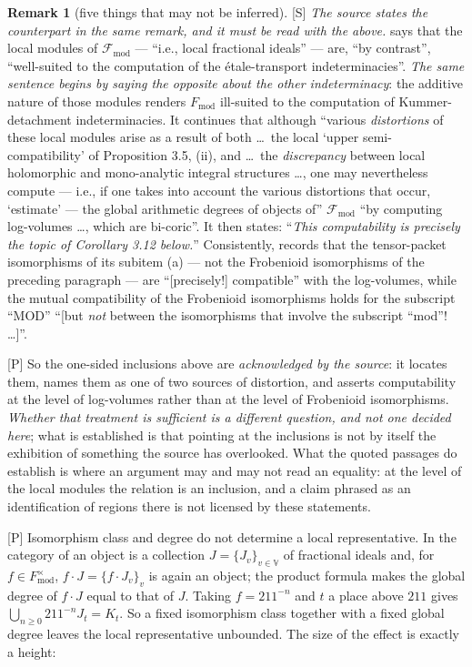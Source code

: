 \documentclass[11pt]{article}
\theoremstyle{plain}
\theoremstyle{definition}
\newtheorem{remark}{Remark}
\newcommand{\Fmod}{F_{\mathrm{mod}}}
\begin{document}
\begin{remark}[five things that may not be inferred]
\textup{[S]} \emph{The source states the counterpart in the same remark, and it must
be read with the above.}  \cite[Rem.~3.10.1(iii)]{IUT3} says that the local modules
of $\mathcal F_{\mathrm{mod}}$ --- ``i.e., local fractional ideals'' --- are, ``by
contrast'', ``well-suited to the computation of the étale-transport
indeterminacies''.  \emph{The same sentence begins by saying the opposite about the
other indeterminacy}: the additive nature of those modules renders $\Fmod$
ill-suited to the computation of Kummer-detachment indeterminacies.  It continues that
although ``various \emph{distortions} of these local
modules arise as a result of both \dots\ the local `upper semi-compatibility' of
Proposition 3.5, (ii), and \dots\ the \emph{discrepancy} between local holomorphic
and mono-analytic integral structures \dots, one may nevertheless compute --- i.e.,
if one takes into account the various distortions that occur, `estimate' --- the
global arithmetic degrees of objects of'' $\mathcal F_{\mathrm{mod}}$ ``by computing
log-volumes \dots, which are bi-coric''.  It then states: ``\emph{This computability
is precisely the topic of Corollary 3.12 below.}''  Consistently,
\cite[Thm.~3.11(ii)]{IUT3} records that the tensor-packet isomorphisms of its
subitem (a) --- not the Frobenioid isomorphisms of the preceding paragraph --- are
``[precisely!] compatible'' with the log-volumes, while the mutual compatibility of
the Frobenioid isomorphisms holds for the subscript ``MOD'' ``[but \emph{not}
between the isomorphisms that involve the subscript ``mod''! \dots]''.

\textup{[P]} So the one-sided inclusions above are \emph{acknowledged by the source}:
it locates them, names them as one of two sources of distortion, and asserts
computability at the level of log-volumes rather than at the level of Frobenioid
isomorphisms.  \emph{Whether that treatment is sufficient is a different question,
and not one decided here}; what is established is that pointing at the inclusions is
not by itself the exhibition of something the source has overlooked.  What the quoted passages do establish is where an
argument may and may not read an equality: at the level of the local modules the
relation is an inclusion, and a claim phrased as an identification of regions there
is not licensed by these statements.

\textup{[P]} Isomorphism class and degree do not determine a local representative.
In the category of \cite[Ex.~3.6(ii)]{IUT3} an object is a collection
$J=\{J_v\}_{v\in\mathbb V}$ of fractional ideals and, for $f\in F_{\mathrm{mod}}^\times$,
$f\cdot J=\{f\cdot J_v\}_v$ is again an object; the product formula makes the global
degree of $f\cdot J$ equal to that of $J$.  Taking $f=211^{-n}$ and $t$ a place above
$211$ gives $\bigcup_{n\ge0}211^{-n}J_t=K_t$.  So a fixed isomorphism class together
with a fixed global degree leaves the local representative unbounded.  The size of
the effect is exactly a height:


\end{remark}
\end{document}
